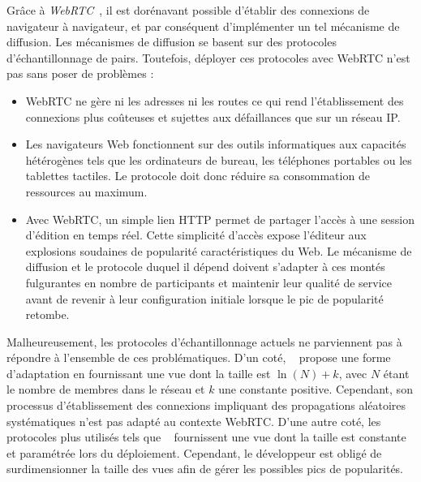 Grâce à \emph{WebRTC}~\cite{webrtc}, il est dorénavant possible d'établir des
connexions de navigateur à navigateur, et par conséquent d'implémenter un tel
mécanisme de diffusion.
Les mécanismes de diffusion se basent sur des protocoles d'échantillonnage de
pairs. Toutefois, déployer ces protocoles avec WebRTC n'est pas sans poser de
problèmes :
\begin{itemize}
\item WebRTC ne gère ni les adresses ni les routes ce qui rend l'établissement
  des connexions plus coûteuses et sujettes aux défaillances que sur un réseau
  IP.
\item Les navigateurs Web fonctionnent sur des outils informatiques aux
  capacités hétérogènes tels que les ordinateurs de bureau, les téléphones
  portables ou les tablettes tactiles. Le protocole doit donc réduire sa
  consommation de ressources au maximum.
\item Avec WebRTC, un simple lien HTTP %
  permet de partager l'accès à une session d'édition en temps réel. Cette
  simplicité d'accès expose l'éditeur aux explosions soudaines de popularité
  caractéristiques du Web.
  Le mécanisme de diffusion et le protocole duquel il dépend doivent s'adapter à
  ces montés fulgurantes en nombre de participants et maintenir leur qualité de
  service avant de revenir à leur configuration initiale lorsque le pic de
  popularité retombe.
\end{itemize}

Malheureusement, les protocoles d'échantillonnage actuels ne parviennent pas à
répondre à l'ensemble de ces problématiques. D'un coté,
\SCAMP~\cite{ganesh2001scamp, ganesh2003peer} propose une forme d'adaptation en
fournissant une vue dont la taille est $\ln (N) + k$, avec $N$ étant le nombre
de membres dans le réseau et $k$ une constante positive. Cependant, son
processus d'établissement des connexions impliquant des propagations aléatoires
systématiques n'est pas adapté au contexte WebRTC. D'une autre coté, les
protocoles plus utilisés tels que \CYCLON~\cite{voulgaris2005cyclon} fournissent
une vue dont la taille est constante et paramétrée lors du
déploiement. Cependant, le développeur est obligé de surdimensionner la taille
des vues afin de gérer les possibles pics de popularités.



